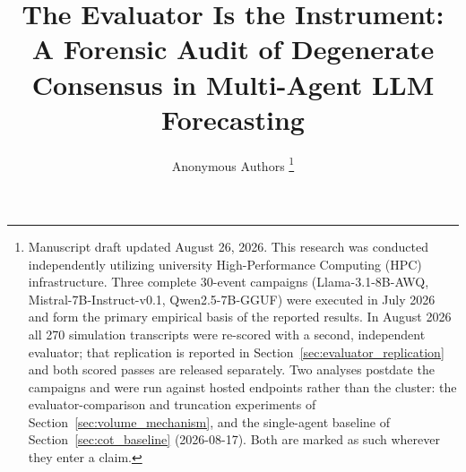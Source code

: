 \documentclass[11pt,journal,onecolumn]{IEEEtran}
\begin{document}
\title{\bfseries The Evaluator Is the Instrument: A Forensic Audit of Degenerate Consensus in Multi-Agent LLM Forecasting}

\author{Anonymous Authors
\thanks{Manuscript draft updated August 26, 2026. This research was conducted independently utilizing university High-Performance Computing (HPC) infrastructure. Three complete 30-event campaigns (Llama-3.1-8B-AWQ, Mistral-7B-Instruct-v0.1, Qwen2.5-7B-GGUF) were executed in July 2026 and form the primary empirical basis of the reported results. In August 2026 all 270 simulation transcripts were re-scored with a second, independent evaluator; that replication is reported in Section~\ref{sec:evaluator_replication} and both scored passes are released separately. Two analyses postdate the campaigns and were run against hosted endpoints rather than the cluster: the evaluator-comparison and truncation experiments of Section~\ref{sec:volume_mechanism}, and the single-agent baseline of Section~\ref{sec:cot_baseline} (2026-08-17). Both are marked as such wherever they enter a claim.}
}

\maketitle
\end{document}
